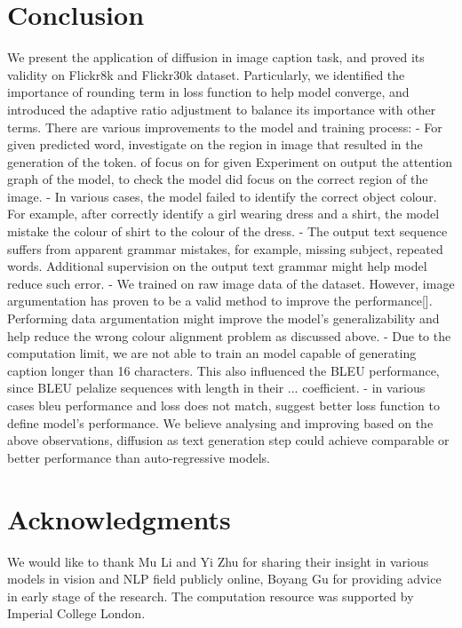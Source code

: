 \documentclass{article}
\begin{document}
\section{Conclusion}
We present the application of diffusion in image caption task, and proved its validity on Flickr8k and Flickr30k dataset. Particularly, we identified the importance of rounding term in loss function to help model converge, and introduced the adaptive ratio adjustment to balance its importance with other terms. There are various improvements to the model and training process:
- For given predicted word, investigate on the region in image that resulted in the generation of the token.  of focus on for given Experiment on output the attention graph of the model, to check the model did focus on the correct region of the image.
- In various cases, the model failed to identify the correct object colour. For example, after correctly identify a girl wearing dress and a shirt, the model mistake the colour of shirt to the colour of the dress. 
- The output text sequence suffers from apparent grammar mistakes, for example, missing subject, repeated words. Additional supervision on the output text grammar might help model reduce such error.
- We trained on raw image data of the dataset. However, image argumentation has proven to be a valid method to improve the performance[]. Performing data argumentation might improve the model's generalizability and help reduce the wrong colour alignment problem as discussed above. 
- Due to the computation limit, we are not able to train an model capable of generating caption longer than 16 characters. This also influenced the BLEU performance, since BLEU pelalize sequences with length in their ... coefficient. 
- in various cases bleu performance and loss does not match, suggest better loss function to define model's performance.
We believe analysing and improving based on the above observations, diffusion as text generation step could achieve comparable or better performance than auto-regressive models. 

\section*{Acknowledgments}
We would like to thank Mu Li and Yi Zhu for sharing their insight in various models in vision and NLP field publicly online, Boyang Gu for providing advice in early stage of the research. The computation resource was supported by Imperial College London. 

  
  
\end{document}
